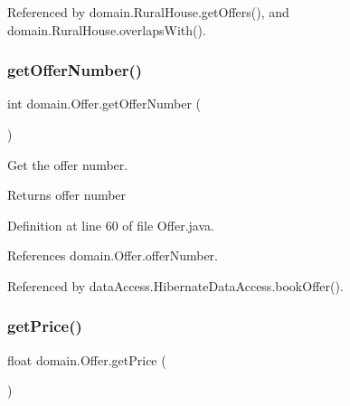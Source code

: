 Referenced by domain.\+Rural\+House.\+get\+Offers(), and domain.\+Rural\+House.\+overlaps\+With().

\mbox{\label{classdomain_1_1Offer_ab9e27c474ec6819a27eac1847d876c3a}} 
\subsubsection{\texorpdfstring{getOfferNumber()}{getOfferNumber()}}
{\footnotesize\ttfamily int domain.\+Offer.\+get\+Offer\+Number (\begin{DoxyParamCaption}{ }\end{DoxyParamCaption})}



Get the offer number. 

\begin{DoxyReturn}{Returns}
offer number 
\end{DoxyReturn}


Definition at line 60 of file Offer.\+java.


\begin{DoxyCode}{0}

\end{DoxyCode}


References domain.\+Offer.\+offer\+Number.



Referenced by data\+Access.\+Hibernate\+Data\+Access.\+book\+Offer().

\mbox{\label{classdomain_1_1Offer_a4ebf9c6f415709b527e006fdffa3a0c3}} 
\subsubsection{\texorpdfstring{getPrice()}{getPrice()}}
{\footnotesize\ttfamily float domain.\+Offer.\+get\+Price (\begin{DoxyParamCaption}{ }\end{DoxyParamCaption})}




